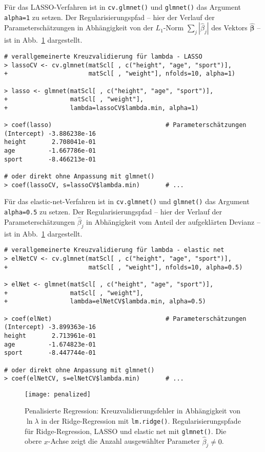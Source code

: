 Für das LASSO-Verfahren ist in \lstinline!cv.glmnet()! und \lstinline!glmnet()! das Argument \lstinline!alpha=1! zu setzen. Der Regularisierungspfad -- hier der Verlauf der Parameterschätzungen in Abhängigkeit von der $L_{1}$-Norm $\sum_{j} |\hat{\beta}_{j}|$ des Vektors $\hat{\bm{\beta}}$ -- ist in Abb.\ \ref{fig:penalized} dargestellt.
\begin{lstlisting}
# verallgemeinerte Kreuzvalidierung für lambda - LASSO
> lassoCV <- cv.glmnet(matScl[ , c("height", "age", "sport")],
+                      matScl[ , "weight"], nfolds=10, alpha=1)

> lasso <- glmnet(matScl[ , c("height", "age", "sport")],
+                 matScl[ , "weight"],
+                 lambda=lassoCV$lambda.min, alpha=1)

> coef(lasso)                               # Parameterschätzungen
(Intercept) -3.886238e-16
height       2.708041e-01
age         -1.667786e-01
sport       -8.466213e-01

# oder direkt ohne Anpassung mit glmnet()
> coef(lassoCV, s=lassoCV$lambda.min)       # ...
\end{lstlisting}

Für das elastic-net-Verfahren ist in \lstinline!cv.glmnet()! und \lstinline!glmnet()! das Argument \lstinline!alpha=0.5! zu setzen. Der Regularisierungspfad -- hier der Verlauf der Parameterschätzungen $\hat{\beta}_{j}$ in Abhängigkeit vom Anteil der aufgeklärten Devianz -- ist in Abb.\ \ref{fig:penalized} dargestellt.
\begin{lstlisting}
# verallgemeinerte Kreuzvalidierung für lambda - elastic net
> elNetCV <- cv.glmnet(matScl[ , c("height", "age", "sport")],
+                      matScl[ , "weight"], nfolds=10, alpha=0.5)

> elNet <- glmnet(matScl[ , c("height", "age", "sport")],
+                 matScl[ , "weight"],
+                 lambda=elNetCV$lambda.min, alpha=0.5)

> coef(elNet)                               # Parameterschätzungen
(Intercept) -3.899363e-16
height       2.713961e-01
age         -1.674823e-01
sport       -8.447744e-01

# oder direkt ohne Anpassung mit glmnet()
> coef(elNetCV, s=elNetCV$lambda.min)       # ...
\end{lstlisting}

\begin{figure}[ht]
\centering
\texttt{[image: penalized]}
\vspace*{-0.5em}
\caption{Penalisierte Regression: Kreuzvalidierungsfehler in Abhängigkeit von $\ln \lambda$ in der Ridge-Regression mit \lstinline!lm.ridge()!. Regularisierungspfade für Ridge-Regression, LASSO und elastic net mit \lstinline!glmnet()!. Die obere $x$-Achse zeigt die Anzahl ausgewählter Parameter $\hat{\beta}_{j} \neq 0$.}
\label{fig:penalized}
\end{figure}

